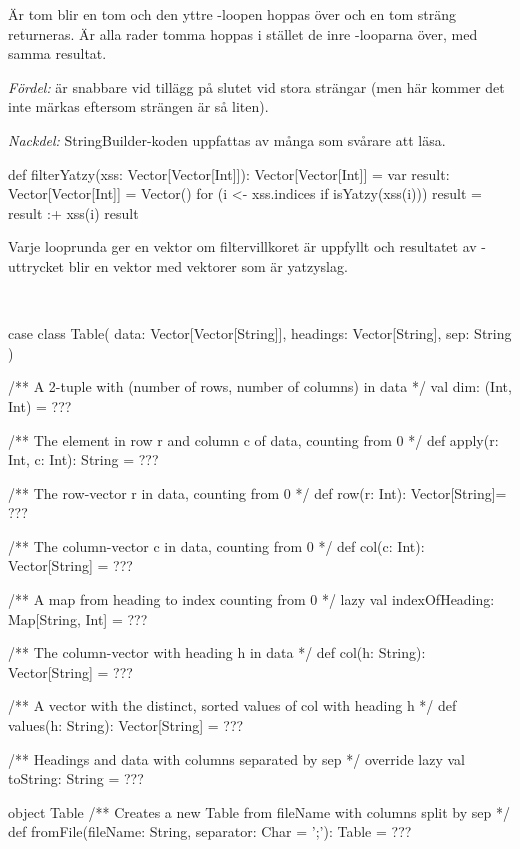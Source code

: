 Är  tom blir  en tom  och den yttre -loopen hoppas över och en tom sträng returneras.
Är alla rader tomma hoppas i stället de inre -looparna över, med samma resultat.

\emph{Fördel:}  är snabbare vid tillägg på slutet vid stora strängar (men här kommer det inte märkas eftersom strängen är så liten).

\emph{Nackdel:} StringBuilder-koden uppfattas av många som svårare att läsa.

\SubtaskSolved
\begin{Code}
def filterYatzy(xss: Vector[Vector[Int]]): Vector[Vector[Int]] = {
	var result: Vector[Vector[Int]] = Vector()
	for (i <- xss.indices if isYatzy(xss(i))) result = result :+ xss(i)
	result
}
\end{Code}

\SubtaskSolved  Varje looprunda ger en vektor  om filtervillkoret är uppfyllt och resultatet av -uttrycket blir en vektor med vektorer som är yatzyslag.

\QUESTEND




\QUESTBEGIN

\Task  \what~  %

\begin{CodeSmall}
case class Table(
  data: Vector[Vector[String]],
  headings: Vector[String],
  sep: String
){
  /** A 2-tuple with (number of rows, number of columns) in data */
  val dim: (Int, Int) = ???

  /** The element in row r and column c of data, counting from 0 */
  def apply(r: Int, c: Int): String = ???

  /** The row-vector r in data, counting from 0 */
  def row(r: Int): Vector[String]= ???

  /** The column-vector c in data, counting from 0 */
  def col(c: Int): Vector[String] = ???

  /** A map from heading to index counting from 0 */
  lazy val indexOfHeading: Map[String, Int] = ???

  /** The column-vector with heading h in data */
  def col(h: String): Vector[String] = ???

  /** A vector with the distinct, sorted values of col with heading h */
  def values(h: String): Vector[String] = ???

  /** Headings and data with columns separated by sep */
  override lazy val toString: String = ???
}

object Table {
  /** Creates a new Table from fileName with columns split by sep */
  def fromFile(fileName: String, separator: Char = ';'): Table = ???
}
\end{CodeSmall}

